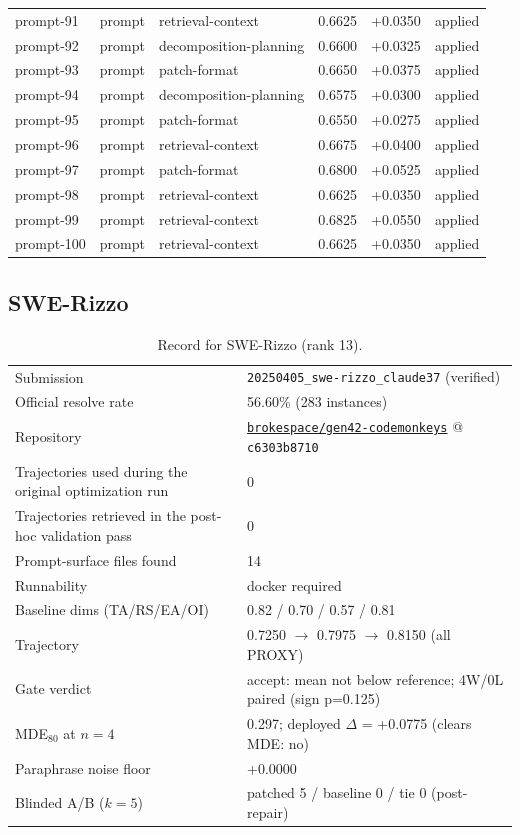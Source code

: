 \begin{center}
\begin{longtable}{llp{5.2cm}rrl}
prompt-91 & prompt & retrieval-context & 0.6625 & +0.0350 & applied \\
prompt-92 & prompt & decomposition-planning & 0.6600 & +0.0325 & applied \\
prompt-93 & prompt & patch-format & 0.6650 & +0.0375 & applied \\
prompt-94 & prompt & decomposition-planning & 0.6575 & +0.0300 & applied \\
prompt-95 & prompt & patch-format & 0.6550 & +0.0275 & applied \\
prompt-96 & prompt & retrieval-context & 0.6675 & +0.0400 & applied \\
prompt-97 & prompt & patch-format & 0.6800 & +0.0525 & applied \\
prompt-98 & prompt & retrieval-context & 0.6625 & +0.0350 & applied \\
prompt-99 & prompt & retrieval-context & 0.6825 & +0.0550 & applied \\
prompt-100 & prompt & retrieval-context & 0.6625 & +0.0350 & applied \\
\bottomrule\end{longtable}\end{center}
\clearpage
\subsection{SWE-Rizzo}
\label{app:agent13}
\begin{table}[h]\centering\scriptsize
\caption{Record for SWE-Rizzo (rank 13).}
\begin{tabular}{lp{8.2cm}}\toprule
Submission & \texttt{20250405\_\allowbreak{}swe-rizzo\_\allowbreak{}claude37} (verified) \\
Official resolve rate & 56.60\% (283 instances) \\
Repository & \href{https://github.com/brokespace/gen42-codemonkeys}{\texttt{brokespace/gen42-codemonkeys}} @ \texttt{c6303b8710} \\
Trajectories used during the original optimization run & 0 \\
Trajectories retrieved in the post-hoc validation pass & 0 \\
Prompt-surface files found & 14 \\
Runnability & docker required \\
Baseline dims (TA/RS/EA/OI) & 0.82 / 0.70 / 0.57 / 0.81 \\
Trajectory & 0.7250 $\to$ 0.7975 $\to$ 0.8150 (all PROXY) \\
Gate verdict & accept: mean not below reference; 4W/0L paired (sign p=0.125) \\
MDE$_{80}$ at $n{=}4$ & 0.297; deployed $\Delta$ = +0.0775 (clears MDE: no) \\
Paraphrase noise floor & +0.0000 \\
Blinded A/B ($k{=}5$) & patched 5 / baseline 0 / tie 0 (post-repair) \\
\bottomrule\end{tabular}\end{table}
